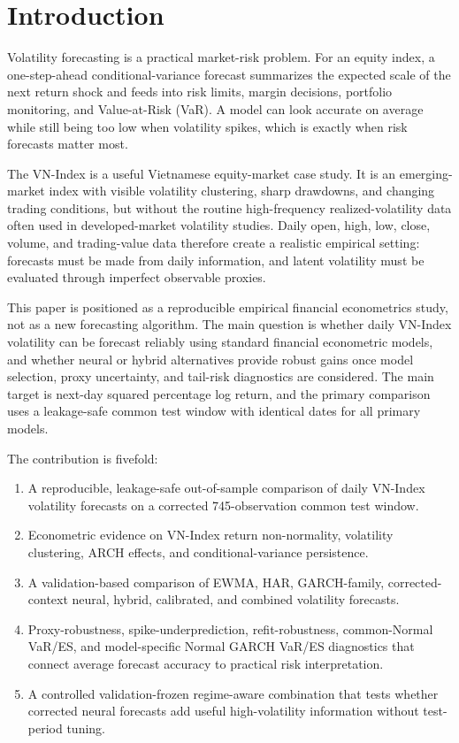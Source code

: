 \section{Introduction}

Volatility forecasting is a practical market-risk problem. For an equity index, a one-step-ahead conditional-variance forecast summarizes the expected scale of the next return shock and feeds into risk limits, margin decisions, portfolio monitoring, and Value-at-Risk (VaR). A model can look accurate on average while still being too low when volatility spikes, which is exactly when risk forecasts matter most.

The VN-Index is a useful Vietnamese equity-market case study. It is an emerging-market index with visible volatility clustering, sharp drawdowns, and changing trading conditions, but without the routine high-frequency realized-volatility data often used in developed-market volatility studies. Daily open, high, low, close, volume, and trading-value data therefore create a realistic empirical setting: forecasts must be made from daily information, and latent volatility must be evaluated through imperfect observable proxies.

This paper is positioned as a reproducible empirical financial econometrics study, not as a new forecasting algorithm. The main question is whether daily VN-Index volatility can be forecast reliably using standard financial econometric models, and whether neural or hybrid alternatives provide robust gains once model selection, proxy uncertainty, and tail-risk diagnostics are considered. The main target is next-day squared percentage log return, and the primary comparison uses a leakage-safe common test window with identical dates for all primary models.

The contribution is fivefold:
\begin{enumerate}
\item A reproducible, leakage-safe out-of-sample comparison of daily VN-Index volatility forecasts on a corrected 745-observation common test window.
\item Econometric evidence on VN-Index return non-normality, volatility clustering, ARCH effects, and conditional-variance persistence.
\item A validation-based comparison of EWMA, HAR, GARCH-family, corrected-context neural, hybrid, calibrated, and combined volatility forecasts.
\item Proxy-robustness, spike-underprediction, refit-robustness, common-Normal VaR/ES, and model-specific Normal GARCH VaR/ES diagnostics that connect average forecast accuracy to practical risk interpretation.
\item A controlled validation-frozen regime-aware combination that tests whether corrected neural forecasts add useful high-volatility information without test-period tuning.
\end{enumerate}

